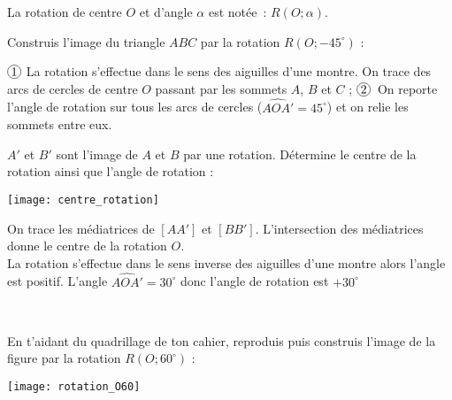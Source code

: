 \begin{remarque}
La rotation de centre $O$ et d'angle $\alpha$ est notée : $R(O ; \alpha)$.
 \end{remarque}

\begin{methode*1}[La rotation]

 \begin{exemple*1}
 Construis l'image du triangle $ABC$ par la rotation $R(O ; - 45^\circ)$ :
 

\textcolor{H1}{$\circled{1}$} La rotation s'effectue dans le sens des aiguilles d'une montre. On trace des arcs de cercles de centre $O$ passant par les sommets $A$, $B$ et $C$ ;
\textcolor{H1}{$\circled{2}$} On reporte l'angle de rotation sur tous les arcs de cercles ($\widehat{AOA'} = 45^\circ$) et on relie les sommets entre eux.
 \end{exemple*1}
 
\begin{exemple*1}
$A'$ et $B'$ sont l'image de $A$ et $B$ par une rotation. Détermine le centre de la rotation ainsi que l'angle de rotation :

\begin{minipage}[c]{0.44\linewidth}
\texttt{[image: centre\_rotation]}
 \end{minipage} \hfill%
 \begin{minipage}[c]{0.52\linewidth}
On trace les médiatrices de $[AA']$ et $[BB']$. L'intersection des médiatrices donne le centre de la rotation $O$. \\[0.5em]
La rotation s'effectue dans le sens inverse des aiguilles d'une montre alors l'angle est positif. L'angle $\widehat{AOA'} = 30^\circ$ donc l'angle de rotation est $+ 30^\circ$
 \end{minipage} \\ 
 \end{exemple*1}

 \exercice
 En t'aidant du quadrillage de ton cahier, reproduis puis construis l'image de la figure par la rotation $R(O ; 60^\circ)$ : \\[0.5em]
 \begin{center} \texttt{[image: rotation\_O60]} \end{center}

 \end{methode*1}
 
